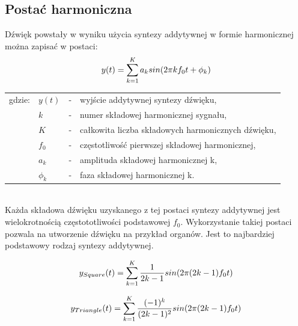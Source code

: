 \subsection{Postać harmoniczna} \label{pos_harm}
Dźwięk powstały w wyniku użycia syntezy addytywnej w formie harmonicznej można zapisać w postaci:
\begin{equation} \label{equ:addit_time_harm}
y(t) = \sum_{k=1}^{K} a_{k}sin(2\pi kf_{0}t + \phi_{k})  \\  
\end{equation}
\begin{tabular}{ l l l l}
	gdzie: & $y(t)$ &  - & wyjście addytywnej syntezy dźwięku, \\
	&	$k$ & - &  numer składowej harmonicznej sygnału, \\
	&	$K$ & - &  całkowita liczba składowych harmonicznych dźwięku,\\
	&	$f_{0}$ & - &  częstotliwość pierwszej składowej harmonicznej,\\
	&	$a_{k}$ & - &  amplituda składowej harmonicznej k, \\
	&	$\phi_{k}$ & - &  faza składowej harmonicznej k. \\
\end{tabular} \\

Każda składowa dźwięku uzyskanego z tej postaci syntezy addytywnej jest wielokrotnością częstototliwości podstawowej $f_{0}$. Wykorzystanie takiej postaci pozwala na utworzenie dźwięku na przykład organów. Jest to najbardziej podstawowy rodzaj syntezy addytywnej.


\begin{equation} \label{equ:addit_sqr}
y_{Square}(t) = \sum_{k=1}^{K} \frac{1}{2k-1} sin(2\pi (2k-1)f_{0}t) \\
\end{equation}

\begin{equation} \label{equ:addit_trng}
y_{Triangle}(t) = \sum_{k=1}^{K} \frac{(-1)^k}{(2k-1)^2} sin(2\pi (2k-1)f_{0}t)  \\
\end{equation}

